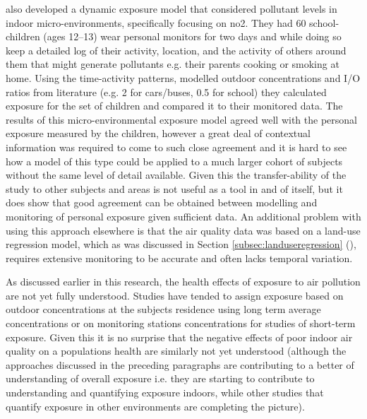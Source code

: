 \cite{Johnson2012} also developed a dynamic exposure model that considered pollutant levels in indoor micro-environments, specifically focusing on \gls{no2}. They had 60 school-children (ages 12--13) wear personal monitors for two days and while doing so keep a detailed log of their activity, location, and the activity of others around them that might generate pollutants e.g. their parents cooking or smoking at home. Using the time-activity patterns, modelled outdoor concentrations and I/O ratios from literature (e.g. 2 for cars/buses, 0.5 for school) they calculated exposure for the set of children and compared it to their monitored data. The results of this micro-environmental exposure model agreed well with the personal exposure measured by the children, however a great deal of contextual information was required to come to such close agreement and it is hard to see how a model of this type could be applied to a much larger cohort of subjects without the same level of detail available. Given this the transfer-ability of the study to other subjects and areas is not useful as a tool in and of itself, but it does show that good agreement can be obtained between modelling and monitoring of personal exposure given sufficient data. An additional problem with using this approach elsewhere is that the air quality data was based on a land-use regression model, which as was discussed in Section \ref{subsec:landuseregression} (), requires extensive monitoring to be accurate and often lacks temporal variation.

As discussed earlier in this research, the health effects of exposure to air pollution are not yet fully understood. Studies have tended to assign exposure based on outdoor concentrations at the subjects residence using long term average concentrations or on monitoring stations concentrations for studies of short-term exposure. Given this it is no surprise that the negative effects of poor indoor air quality on a populations health are similarly not yet understood (although the approaches discussed in the preceding paragraphs are contributing to a better of understanding of overall exposure i.e. they are starting to contribute to understanding and quantifying exposure indoors, while other studies that quantify exposure in other environments are completing the picture).

